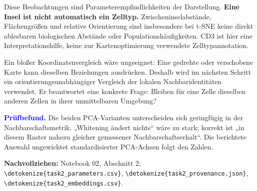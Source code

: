 \documentclass[11pt,a4paper]{article}
\newcommand{\code}[1]{\expandafter\nolinkurl\expandafter{\detokenize{#1}}}
\newcommand{\source}[1]{\par{\footnotesize\raggedright\color{muted}\textbf{Nachvollziehen:} #1\par}}
\newcommand{\finding}[1]{\par\smallskip\noindent\textcolor{blue}{\textbf{Prüfbefund.}} #1\par}
\begin{document}
Diese Beobachtungen sind Parameterempfindlichkeiten der Darstellung.
\textbf{Eine Insel ist nicht automatisch ein Zelltyp.} Zwischeninselabstände,
Flächengrößen und relative Orientierung sind insbesondere bei t-SNE keine
direkt ablesbaren biologischen Abstände oder Populationshäufigkeiten.
CD3 ist hier eine Interpretationshilfe, keine zur Kartenoptimierung
verwendete Zelltypannotation.

Ein bloßer Koordinatenvergleich wäre ungeeignet: Eine gedrehte oder
verschobene Karte kann dieselben Beziehungen ausdrücken. Deshalb wird im
nächsten Schritt ein orientierungsunabhängiger Vergleich der lokalen
Nachbaridentitäten verwendet. Er beantwortet eine konkrete Frage: Bleiben
für eine Zelle dieselben anderen Zellen in ihrer unmittelbaren Umgebung?

\finding{Die beiden PCA-Varianten unterscheiden sich geringfügig in der
Nachbarschaftsmetrik. „Whitening ändert nichts“ wäre zu stark; korrekt ist
„in diesem Raster nahezu gleicher gemessener Nachbarschaftserhalt“. Die
berichtete Auswahl ungewichtet standardisierter PCA-Achsen folgt den Zahlen.}
\source{Notebook 02, Abschnitt 2; \code{task2_parameters.csv},
\code{task2_provenance.json}, \code{task2_embeddings.csv}.}

\clearpage
\end{document}
